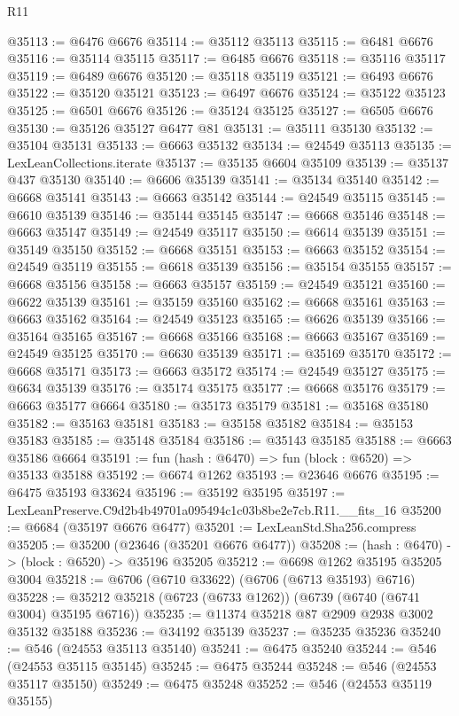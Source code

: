 \begin{lexlean}{R11}
\begin{coremodule}
@35113 := @6476 @6676
@35114 := @35112 @35113
@35115 := @6481 @6676
@35116 := @35114 @35115
@35117 := @6485 @6676
@35118 := @35116 @35117
@35119 := @6489 @6676
@35120 := @35118 @35119
@35121 := @6493 @6676
@35122 := @35120 @35121
@35123 := @6497 @6676
@35124 := @35122 @35123
@35125 := @6501 @6676
@35126 := @35124 @35125
@35127 := @6505 @6676
@35130 := @35126 @35127 @6477 @81
@35131 := @35111 @35130
@35132 := @35104 @35131
@35133 := @6663 @35132
@35134 := @24549 @35113
@35135 := LexLeanCollections.iterate
@35137 := @35135 @6604 @35109
@35139 := @35137 @437 @35130
@35140 := @6606 @35139
@35141 := @35134 @35140
@35142 := @6668 @35141
@35143 := @6663 @35142
@35144 := @24549 @35115
@35145 := @6610 @35139
@35146 := @35144 @35145
@35147 := @6668 @35146
@35148 := @6663 @35147
@35149 := @24549 @35117
@35150 := @6614 @35139
@35151 := @35149 @35150
@35152 := @6668 @35151
@35153 := @6663 @35152
@35154 := @24549 @35119
@35155 := @6618 @35139
@35156 := @35154 @35155
@35157 := @6668 @35156
@35158 := @6663 @35157
@35159 := @24549 @35121
@35160 := @6622 @35139
@35161 := @35159 @35160
@35162 := @6668 @35161
@35163 := @6663 @35162
@35164 := @24549 @35123
@35165 := @6626 @35139
@35166 := @35164 @35165
@35167 := @6668 @35166
@35168 := @6663 @35167
@35169 := @24549 @35125
@35170 := @6630 @35139
@35171 := @35169 @35170
@35172 := @6668 @35171
@35173 := @6663 @35172
@35174 := @24549 @35127
@35175 := @6634 @35139
@35176 := @35174 @35175
@35177 := @6668 @35176
@35179 := @6663 @35177 @6664
@35180 := @35173 @35179
@35181 := @35168 @35180
@35182 := @35163 @35181
@35183 := @35158 @35182
@35184 := @35153 @35183
@35185 := @35148 @35184
@35186 := @35143 @35185
@35188 := @6663 @35186 @6664
@35191 := fun (hash : @6470) => fun (block : @6520) => @35133 @35188
@35192 := @6674 @1262
@35193 := @23646 @6676
@35195 := @6475 @35193 @33624
@35196 := @35192 @35195
@35197 := LexLeanPreserve.C9d2b4b49701a095494c1c03b8be2e7cb.R11.__fits_16
@35200 := @6684 (@35197 @6676 @6477)
@35201 := LexLeanStd.Sha256.compress
@35205 := @35200 (@23646 (@35201 @6676 @6477))
@35208 := (hash : @6470) -> (block : @6520) -> @35196 @35205
@35212 := @6698 @1262 @35195 @35205 @3004
@35218 := @6706 (@6710 @33622) (@6706 (@6713 @35193) @6716)
@35228 := @35212 @35218 (@6723 (@6733 @1262)) (@6739 (@6740 (@6741 @3004) @35195 @6716))
@35235 := @11374 @35218 @87 @2909 @2938 @3002 @35132 @35188
@35236 := @34192 @35139
@35237 := @35235 @35236
@35240 := @546 (@24553 @35113 @35140)
@35241 := @6475 @35240
@35244 := @546 (@24553 @35115 @35145)
@35245 := @6475 @35244
@35248 := @546 (@24553 @35117 @35150)
@35249 := @6475 @35248
@35252 := @546 (@24553 @35119 @35155)

\end{coremodule}
\end{lexlean}
